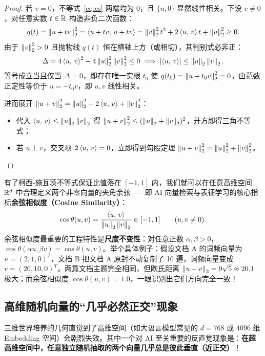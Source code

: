 \begin{proof}
若 $v = 0$，不等式~\eqref{eq:cs} 两端均为 $0$，且 $\{u, 0\}$ 显然线性相关。下设 $v \neq 0$，对任意实数 $t \in \mathbb{R}$ 构造非负二次函数：
\[
q(t) = \left\|u + t v\right\|_2^2 = \left\langle u + tv,\, u + tv \right\rangle = \left\|v\right\|_2^2 t^2 + 2\left\langle u,\, v \right\rangle t + \left\|u\right\|_2^2 \ge 0.
\]
由于 $\left\|v\right\|_2^2 > 0$ 且抛物线 $q(t)$ 恒在横轴上方（或相切），其判别式必非正：
\[
\Delta = 4\left\langle u,\, v \right\rangle^2 - 4\left\|u\right\|_2^2 \left\|v\right\|_2^2 \le 0
\implies \left|\left\langle u,\, v \right\rangle\right| \le \left\|u\right\|_2 \left\|v\right\|_2.
\]
等号成立当且仅当 $\Delta = 0$，即存在唯一实根 $t_0$ 使 $q(t_0) = \left\|u + t_0 v\right\|_2^2 = 0$，由范数正定性等价于 $u = -t_0 v$，即 $u, v$ 线性相关。

进而展开 $\left\|u + v\right\|_2^2 = \left\|u\right\|_2^2 + 2\left\langle u,\, v \right\rangle + \left\|v\right\|_2^2$：
\begin{itemize}
  \item 代入 $\left\langle u,\, v \right\rangle \le \left\|u\right\|_2\left\|v\right\|_2$ 得 $\left\|u+v\right\|_2^2 \le (\left\|u\right\|_2 + \left\|v\right\|_2)^2$，开方即得三角不等式；
  \item 若 $u \perp v$，交叉项 $2\left\langle u,\, v \right\rangle = 0$，立即得到勾股定理 $\left\|u+v\right\|_2^2 = \left\|u\right\|_2^2 + \left\|v\right\|_2^2$。
\end{itemize}
\end{proof}

有了柯西-施瓦茨不等式保证比值落在 $[-1, 1]$ 内，我们就可以在任意高维空间 $\mathbb{R}^d$ 中合理定义两个非零向量的夹角余弦——即 AI 向量检索与表征学习的核心指标\textbf{余弦相似度（Cosine Similarity）}：
\begin{equation}\label{eq:cosine-sim}
\cos\theta(u, v) = \frac{\left\langle u,\, v \right\rangle}{\left\|u\right\|_2 \left\|v\right\|_2} \in [-1, 1] \qquad (u, v \neq 0).
\end{equation}
余弦相似度最重要的工程特性是\textbf{尺度不变性}：对任意正数 $\alpha, \beta > 0$，$\cos\theta(\alpha u, \beta v) = \cos\theta(u, v)$。举个具体例子：假设文档 A 的词频向量为 $u = (2, 1, 0)^T$，文档 B 把文档 A 原封不动复制了 10 遍，词频向量变成 $v = (20, 10, 0)^T$。两篇文档主题完全相同，但欧氏距离 $\left\|u - v\right\|_2 = 9\sqrt{5} \approx 20.1$ 极大；而余弦相似度 $\cos\theta(u, v) = 1.0$，一眼识别出它们方向完全一致！

\subsection{高维随机向量的“几乎必然正交”现象}

三维世界培养的几何直觉到了高维空间（如大语言模型常见的 $d = 768$ 或 $4096$ 维 Embedding 空间）会剧烈失效。其中一个对 AI 至关重要的反直觉现象是：\textbf{在超高维空间中，任意独立随机抽取的两个向量几乎总是彼此垂直（近正交）}！

